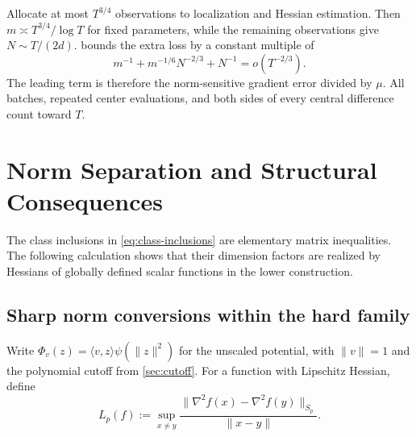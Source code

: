 \documentclass[11pt,a4paper]{article}
\theoremstyle{definition}
\theoremstyle{remark}
\begin{document}
Allocate at most $T^{3/4}$ observations to localization and Hessian estimation. Then $m\asymp T^{3/4}/\log T$ for fixed parameters, while the remaining observations give $N\sim T/(2d)$.  bounds the extra loss by a constant multiple of
\[
 m^{-1}+m^{-1/6}N^{-2/3}+N^{-1}=o(T^{-2/3}).
\]
The leading term is therefore the norm-sensitive gradient error divided by $\mu$. All batches, repeated center evaluations, and both sides of every central difference count toward $T$.

\section{Norm Separation and Structural Consequences}
\label{sec:norm-separation}
The class inclusions in \eqref{eq:class-inclusions} are elementary matrix inequalities. The following calculation shows that their dimension factors are realized by Hessians of globally defined scalar functions in the lower construction.

\subsection{Sharp norm conversions within the hard family}
Write $\Phi_v(z)=\langle v,z\rangle\psi(\|z\|^2)$ for the unscaled potential, with $\|v\|=1$ and the polynomial cutoff from \cref{sec:cutoff}. For a function with Lipschitz Hessian, define
\[
 L_p(f):=\sup_{x\ne y}
 \frac{\|\nabla^2 f(x)-\nabla^2 f(y)\|_{S_p}}{\|x-y\|}.
\]
\end{document}
